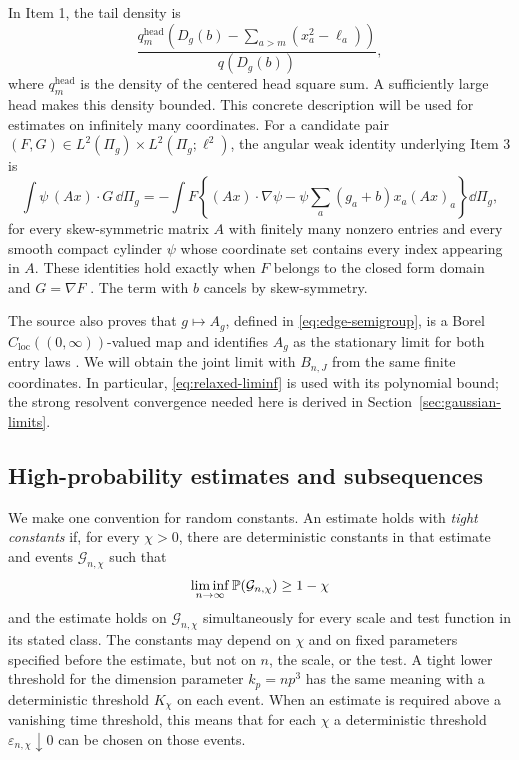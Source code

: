 In Item 1, the tail density is
\[
 \frac{q_m^{\mathrm{head}}\!\left(
     D_g(b)-\sum_{a>m}(x_a^2-\ell_a)\right)}{q(D_g(b))},
\]
where \(q_m^{\mathrm{head}}\) is the density of the centered head square
sum. A sufficiently large head makes this density bounded. This concrete
description will be used for estimates on infinitely many coordinates.
For a candidate pair
\((F,G)\in L^2(\Pi_g)\times L^2(\Pi_g;\ell^2)\), the angular weak
identity underlying Item 3 is
\begin{equation}\label{eq:angular-weak}
 \int \psi\,(Ax)\cdot G\,\dd\Pi_g
 =-\int F\left\{(Ax)\cdot\nabla\psi
       -\psi\sum_a(g_a+b)x_a(Ax)_a\right\}\dd\Pi_g ,
\end{equation}
for every skew-symmetric matrix \(A\) with finitely many nonzero entries
and every smooth compact cylinder \(\psi\) whose coordinate set contains
every index appearing in \(A\). These identities hold exactly when
\(F\) belongs to the closed form domain and \(G=\nabla F\)
\cite[Proposition~5.1]{FUA}. The term with \(b\) cancels by skew-symmetry.

The source also proves that \(g\mapsto A_g\), defined in
\eqref{eq:edge-semigroup}, is a Borel
\(C_{\mathrm{loc}}((0,\infty))\)-valued map and identifies \(A_g\) as
the stationary limit for both entry laws
\cite[Proposition~9.2]{FUA}. We will obtain the joint limit with
\(B_{n,J}\) from the same finite coordinates. In particular,
\eqref{eq:relaxed-liminf} is used with its polynomial bound; the
strong resolvent convergence needed here is derived in
Section~\ref{sec:gaussian-limits}.

\subsection{High-probability estimates and subsequences}

We make one convention for random constants. An estimate holds with
\emph{tight constants} if, for every \(\chi>0\), there are deterministic
constants in that estimate and events \(\mathcal G_{n,\chi}\) such that
\[
 \liminf_{n\to\infty}\mathbb P(\mathcal G_{n,\chi})\ge1-\chi
\]
and the estimate holds on \(\mathcal G_{n,\chi}\) simultaneously for
every scale and test function in its stated class. The constants may
depend on \(\chi\) and on fixed parameters specified before the
estimate, but not on \(n\), the scale, or the test. A tight lower
threshold for the dimension parameter \(k_p=np^3\) has the same meaning with a deterministic
threshold \(K_\chi\) on each event. When an estimate is required above
a vanishing time threshold, this means that for each \(\chi\) a
deterministic threshold \(\varepsilon_{n,\chi}\downarrow0\) can be
chosen on those events.

